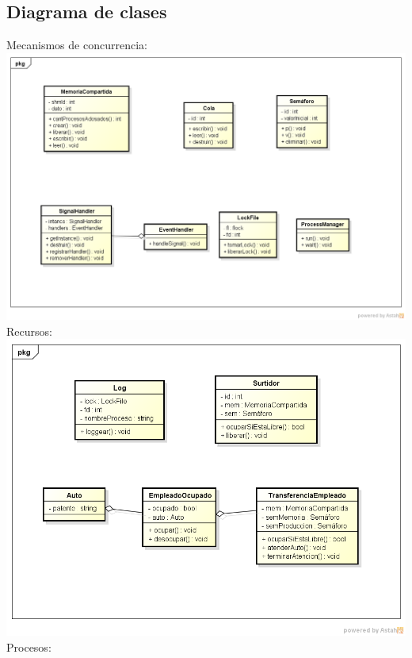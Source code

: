 \documentclass{article}
\begin{document}
\subsection{Diagrama de clases}
Mecanismos de concurrencia:
\\[1\baselineskip]
\includegraphics[width=\textwidth]{ClassDiagram0}
\newpage
Recursos:
\\[1\baselineskip]
\includegraphics[width=\textwidth]{ClassDiagram1}
\newpage
Procesos:
\\[1\baselineskip]
\end{document}
